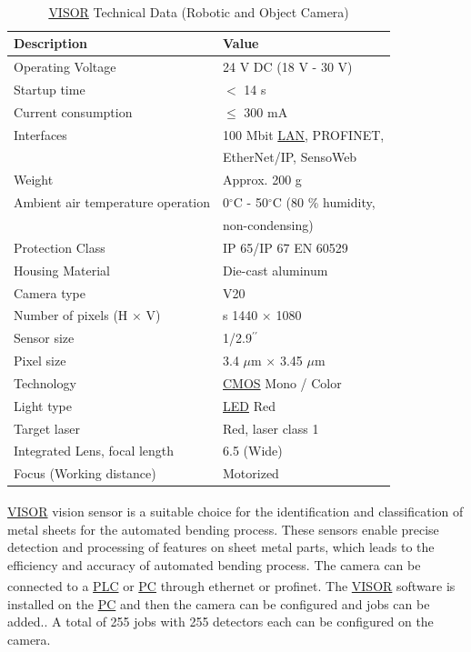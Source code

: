 \begin{table}[h!]
    \centering
    \small
    \renewcommand{\arraystretch}{1.2} %
    \begin{tabular}{ll}
        \textbf{Description} & \textbf{Value} \\ \hline
        Operating Voltage & 24 V DC (18 V - 30 V) \\
        Startup time & $<$ 14 s\\
        Current consumption & $\leq$ 300 mA \\
        Interfaces & 100 Mbit \hyperref[acro:LAN]{LAN}, PROFINET,\\
        & EtherNet/IP, SensoWeb\\ 
        Weight & Approx. 200 g \\ 
        Ambient air temperature operation & 0$^\circ$C - 50$^\circ$C (80 \% humidity,\\
        & non-condensing) \\ 
        Protection Class & IP 65/IP 67 EN 60529\\
        Housing Material & Die-cast aluminum\\
        Camera type & V20 \\ 
        Number of pixels (H $\times$ V) &s 1440 $\times$ 1080\\
        Sensor size & 1/2.9$^{\prime\prime}$ \\ 
        Pixel size & 3.4 $\mu$m $\times$ 3.45 $\mu$m\\
        Technology & \hyperref[acro:CMOS]{CMOS} Mono / Color\\
        Light type & \hyperref[acro:LED]{LED} Red\\ 
        Target laser & Red, laser class 1\\ 
        Integrated Lens, focal length & 6.5 (Wide)\\
        Focus (Working distance) & Motorized \\ \hline
    \end{tabular}
    \caption{\hyperref[acro:VISOR]{VISOR}\textsuperscript{\textregistered} Technical Data (Robotic and Object Camera)}
    \label{visor-technical-data}
\end{table}

\hyperref[acro:VISOR]{VISOR}\textsuperscript{\textregistered} vision sensor is a suitable choice for the identification and classification of metal sheets for the automated bending process. These sensors enable precise detection and processing of features on sheet metal parts, which leads to the efficiency and accuracy of automated bending process. The camera can be connected to a \hyperref[acro:PLC]{PLC} or \hyperref[acro:PC]{PC} through ethernet or profinet. The \hyperref[acro:VISOR]{VISOR}\textsuperscript{\textregistered} software is installed on the \hyperref[acro:PC]{PC} and then the camera can be configured and jobs can be added.\cite{sensopart-software}. A total of 255 jobs with 255 detectors each can be configured on the camera.

